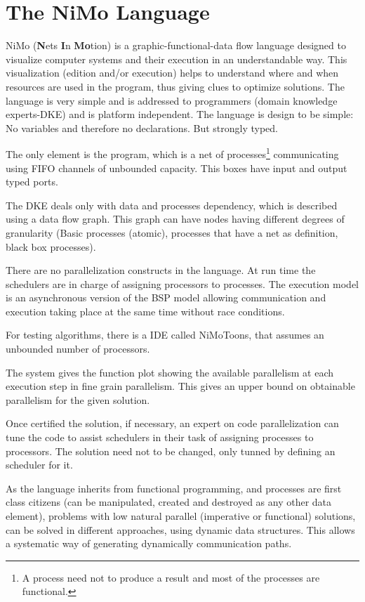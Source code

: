 \documentclass{article}                     \usepackage{graphics}
\begin{document}
\section{The NiMo Language}\label{NiMo}\label{language}


NiMo (\textbf{N}ets \textbf{I}n \textbf{Mo}tion) is a graphic-functional-data flow language designed to visualize computer systems and their execution in an understandable way. This visualization (edition and/or execution) helps   to understand where and when resources are used in the program, thus giving clues to optimize  solutions. The language is very simple and is addressed to programmers (domain knowledge experts-DKE) and is  platform   independent.  The language is design to be simple: No variables and therefore no declarations. But strongly typed. 

The only element is the program, which is a net of  processes\footnote{A process need not to produce a result and most of the processes are functional.} communicating  using FIFO channels of unbounded capacity.  This boxes have input and output typed ports.

The DKE deals only with data and processes dependency, which is described using a data flow graph. This graph can have nodes having different degrees of granularity (Basic processes (atomic), processes that have a net as definition, black box processes).

There are no parallelization constructs in the language. At run time the schedulers  are in charge of assigning  processors to processes. The execution model is an asynchronous version of the BSP model\cite{Valiant:1990:BMP:79173.79181} allowing communication and execution taking place at the same time without race conditions. 

For testing algorithms, there is a IDE called NiMoToons, that assumes an unbounded number of processors.

The system gives the  function plot showing the available parallelism at each execution step    in fine
grain parallelism.  This gives an upper bound on obtainable parallelism for the given solution.  

Once certified the solution, if necessary, an expert on code parallelization can tune the code  to assist schedulers in their task of assigning processes to processors.   The solution need  not to be  changed, only tunned by defining an scheduler for it.






As the language inherits from functional programming, and processes are first class citizens (can be manipulated, created and destroyed as any other data element), problems with  low natural parallel (imperative or functional) solutions, can be solved in different approaches, using dynamic data structures.
This allows a systematic way of generating dynamically communication paths. 
\end{document}
